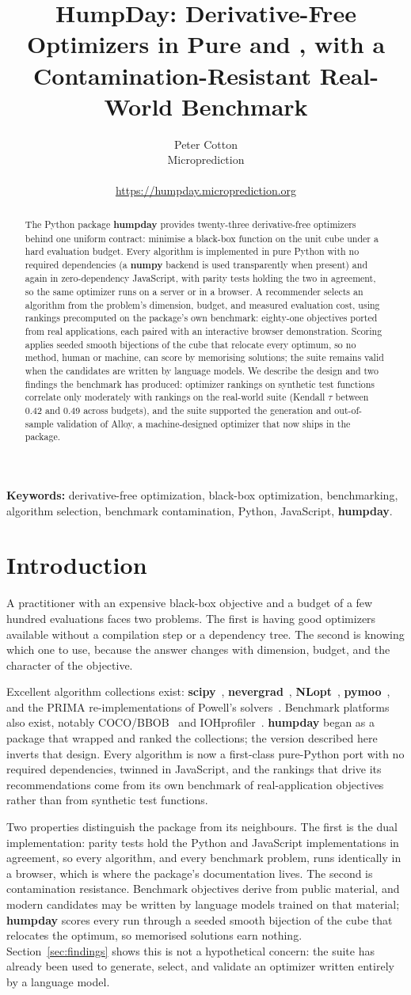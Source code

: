 \documentclass[article]{jss}
\author{
  Peter Cotton\\
  Microprediction\\
  \email{peter.cotton@microprediction.com}\\
  \url{https://humpday.microprediction.org}
}
\title{HumpDay: Derivative-Free Optimizers in Pure \proglang{Python} and
\proglang{JavaScript}, with a Contamination-Resistant Real-World Benchmark}
\providecommand{\proglang}[1]{\textsf{#1}}
\providecommand{\pkg}[1]{\textbf{#1}}
\newcommand{\humpdayabstract}{
The \proglang{Python} package \pkg{humpday} provides twenty-three
derivative-free optimizers behind one uniform contract: minimise a black-box
function on the unit cube under a hard evaluation budget. Every algorithm is
implemented in pure \proglang{Python} with no required dependencies (a
\pkg{numpy} backend is used transparently when present) and again in
zero-dependency \proglang{JavaScript}, with parity tests holding the two in
agreement, so the same optimizer runs on a server or in a browser. A
recommender selects an algorithm from the problem's dimension, budget, and
measured evaluation cost, using rankings precomputed on the package's own
benchmark: eighty-one objectives ported from real applications, each paired
with an interactive browser demonstration. Scoring applies seeded smooth
bijections of the cube that relocate every optimum, so no method, human or
machine, can score by memorising solutions; the suite remains valid when the
candidates are written by language models. We describe the design and two
findings the benchmark has produced: optimizer rankings on synthetic test
functions correlate only moderately with rankings on the real-world suite
(Kendall $\tau$ between 0.42 and 0.49 across budgets), and the suite
supported the generation and out-of-sample validation of Alloy, a
machine-designed optimizer that now ships in the package.
}
\begin{document}
\maketitle

\begin{abstract}
\humpdayabstract
\end{abstract}

\noindent\textbf{Keywords:} derivative-free optimization, black-box
optimization, benchmarking, algorithm selection, benchmark contamination,
\proglang{Python}, \proglang{JavaScript}, \pkg{humpday}.

\section{Introduction} \label{sec:intro}

A practitioner with an expensive black-box objective and a budget of a few
hundred evaluations faces two problems. The first is having good optimizers
available without a compilation step or a dependency tree. The second is
knowing which one to use, because the answer changes with dimension, budget,
and the character of the objective.

Excellent algorithm collections exist: \pkg{scipy}~\citep{scipy2020},
\pkg{nevergrad}~\citep{nevergrad}, \pkg{NLopt}~\citep{nlopt},
\pkg{pymoo}~\citep{pymoo}, and the PRIMA re-implementations of Powell's
solvers~\citep{prima}. Benchmark platforms also exist, notably
COCO/BBOB~\citep{coco} and IOHprofiler~\citep{ioh}. \pkg{humpday} began as a
package that wrapped and ranked the collections; the version described here
inverts that design. Every algorithm is now a first-class pure-\proglang{Python}
port with no required dependencies, twinned in \proglang{JavaScript}, and the
rankings that drive its recommendations come from its own benchmark of
real-application objectives rather than from synthetic test functions.

Two properties distinguish the package from its neighbours. The first is the
dual implementation: parity tests hold the \proglang{Python} and
\proglang{JavaScript} implementations in agreement, so every algorithm, and
every benchmark problem, runs identically in a browser, which is where the
package's documentation lives. The second is contamination resistance.
Benchmark objectives derive from public material, and modern candidates may
be written by language models trained on that material; \pkg{humpday} scores
every run through a seeded smooth bijection of the cube that relocates the
optimum, so memorised solutions earn nothing. Section~\ref{sec:findings}
shows this is not a hypothetical concern: the suite has already been used to
generate, select, and validate an optimizer written entirely by a language
model.
\end{document}
